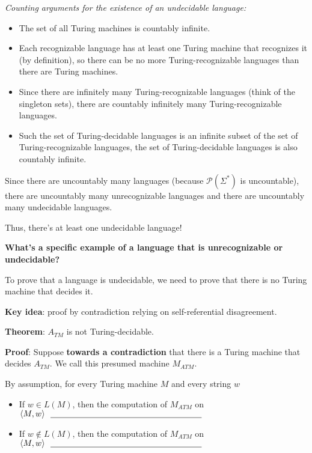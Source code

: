 \documentclass[12pt, oneside]{article}
\begin{document}
    
    {\it Counting arguments for the existence of an undecidable language:}
    \begin{itemize}
        \item The set of all Turing machines is countably infinite.
        \item Each recognizable language has at least one Turing machine that recognizes it (by definition), 
        so there can be no more Turing-recognizable
        languages than there are Turing machines. 
        \item Since there are infinitely many Turing-recognizable languages
        (think of the singleton sets), there are countably infinitely 
        many Turing-recognizable languages.
        \item Such the set of Turing-decidable languages is an infinite subset 
        of the set of Turing-recognizable languages, the set of 
        Turing-decidable languages is also countably infinite.
    \end{itemize}
    
    Since there are uncountably many languages (because $\mathcal{P}(\Sigma^*)$
    is uncountable), there are uncountably many unrecognizable languages
    and there are uncountably many undecidable languages.
    
    
    Thus, there's at least one undecidable language!
    
    \vfill
    
    {\bf What's a specific example of a language that is unrecognizable or undecidable?}
    
    To prove that a language is undecidable, we need to prove that there is no Turing machine that decides it.
    
    {\bf Key idea}: proof by contradiction relying on self-referential disagreement.
    
    

{\bf  Theorem}: $A_{TM}$  is  not  Turing-decidable.

{\bf  Proof}: Suppose {\bf towards a  contradiction}  that there  is a Turing machine  that decides $A_{TM}$.  
We call this presumed machine  $M_{ATM}$.

By  assumption, for every  Turing machine  $M$ and every  string $w$

\begin{itemize}
\item If $w \in L(M)$, then  the computation of $M_{ATM}$  on  $\langle M,w \rangle ~~ \underline{\phantom{\hspace{2.5in}}}$
\item If $w \notin L(M)$, then  the computation of $M_{ATM}$  on  $\langle M,w \rangle ~~ \underline{\phantom{\hspace{2.5in}}}$
\end{itemize}
\end{document}
